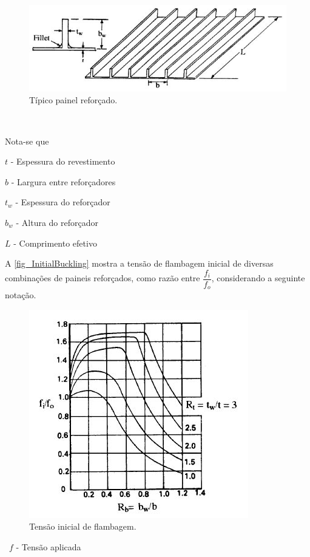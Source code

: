 \begin{figure}[h]
	\caption{\label{fig_StiffenedPanels}Típico painel reforçado.}
  \centering
  \includegraphics[scale=1.0]{figura/StiffenedPanel}
\end{figure}
\

Nota-se que\

$t$ -  Espessura do revestimento \

$b$ - Largura entre reforçadores \

$t_w$ - Espessura do reforçador \

$b_w$ - Altura do reforçador \

$L$ - Comprimento efetivo \
\

A \autoref{fig_InitialBuckling} mostra a tensão de flambagem inicial de diversas combinações de paineis reforçados, como razão entre $\dfrac{f_i}{f_o}$, considerando a seguinte notação.

\begin{figure}[h]
	\caption{\label{fig_InitialBuckling}Tensão inicial de flambagem.}
  \centering
  \includegraphics[scale=1.0]{figura/InitialBuckling}
\end{figure}
\
$f$ - Tensão aplicada\

